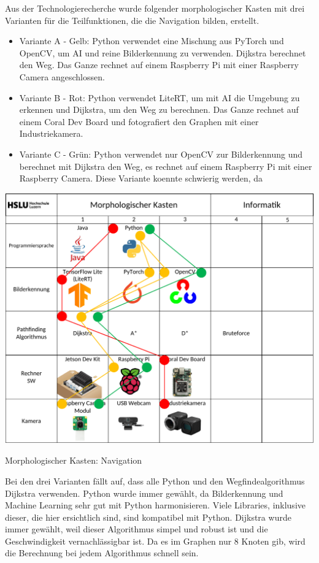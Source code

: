 Aus der Technologierecherche wurde folgender morphologischer Kasten mit drei Varianten für die Teilfunktionen, die die Navigation bilden, erstellt.

\begin{itemize}
     \item Variante A - Gelb: Python verwendet eine Mischung aus PyTorch und OpenCV, um AI und reine Bilderkennung zu verwenden. Dijkstra berechnet den Weg. Das Ganze rechnet auf einem Raspberry Pi mit einer Raspberry Camera angeschlossen.
    \item  Variante B - Rot: Python verwendet LiteRT, um mit AI die Umgebung zu erkennen und Dijkstra, um den Weg zu berechnen. Das Ganze rechnet auf einem Coral Dev Board und fotografiert den Graphen mit einer Industriekamera.
    \item Variante C - Grün: Python verwendet nur OpenCV zur Bilderkennung und berechnet mit Dijkstra den Weg, es rechnet auf einem Raspberry Pi mit einer Raspberry Camera. Diese Variante koennte schwierig werden, da 
\end{itemize}

\begin{table}[H]
\centering
\includegraphics[width=\textwidth]{assets/MK_Informatik.pdf}
\caption{Morphologischer Kasten: Navigation}
\label{table:mk-informatik}
\end{table}


Bei den drei Varianten fällt auf, dass alle Python und den Wegfindealgorithmus Dijkstra verwenden. Python wurde immer gewählt, da Bilderkennung und Machine Learning sehr gut mit Python harmonisieren. Viele Libraries, inklusive dieser, die hier ersichtlich sind, sind kompatibel mit Python. Dijkstra wurde immer gewählt, weil dieser Algorithmus simpel und robust ist und die Geschwindigkeit vernachlässigbar ist. Da es im Graphen nur 8 Knoten gib, wird die Berechnung bei jedem Algorithmus schnell sein.

